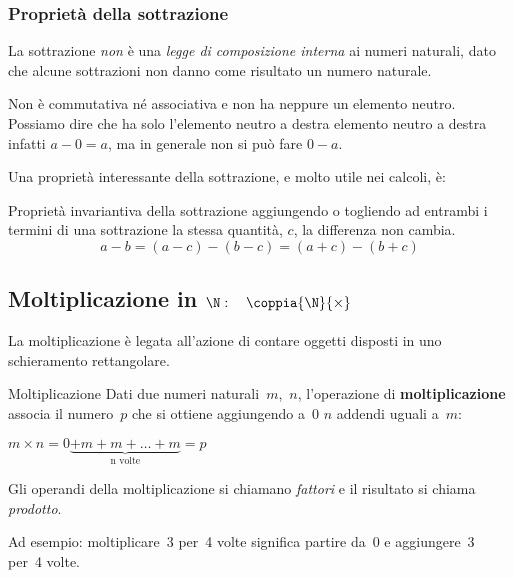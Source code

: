 \subsubsection{Proprietà della sottrazione}

La sottrazione \emph{non} è una \emph{legge di composizione 
interna} ai numeri naturali, dato che alcune sottrazioni 
non danno come risultato un numero naturale.

Non è commutativa né associativa e non ha neppure un elemento neutro.
Possiamo dire che ha solo l'elemento neutro a destra
{elemento neutro a destra} infatti \(a - 0 = a\), ma in generale non si 
può fare \(0 - a\).

Una proprietà interessante della sottrazione, e molto utile nei calcoli, è:

\begin{teorema}{Proprietà invariantiva della sottrazione}{}
aggiungendo o togliendo ad entrambi i termini 
di una sottrazione la stessa quantità, \(c\), 
la differenza non cambia.
\[a - b = (a - c) - (b - c) = (a + c) - (b + c)\]
\end{teorema}


\subsection{Moltiplicazione in 
\texorpdfstring{$\N: \quad \coppia{\N}{\times}$}{N: (N; x)}}

La moltiplicazione è legata all'azione di contare oggetti disposti in uno
schieramento rettangolare.

\begin{definizione}{Moltiplicazione}{}
Dati due numeri naturali~\(m\),~\(n\), l'operazione di 
\textbf{moltiplicazione} 
associa il numero~\(p\) che si ottiene aggiungendo a~0 \(n\) addendi 
uguali a~\(m\):

{\(m \times n = 0 \underbrace{+ m + m + \dots + m}_{\text{n volte}} = p\)}

Gli operandi della moltiplicazione si chiamano \emph{fattori} e il 
risultato si chiama \emph{prodotto}.
\end{definizione}

Ad esempio: moltiplicare~3 per~4 volte significa partire da~0 e 
aggiungere~3 per~4 volte.

\vspace{.5em}

